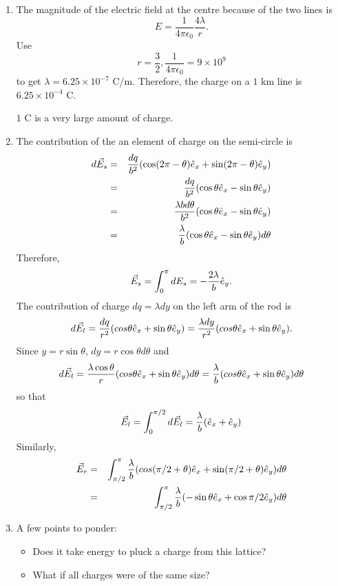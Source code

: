 \documentclass{article}
\begin{document}
\begin{enumerate}
\item The magnitude of the electric field at the centre because of the two lines
is
\[
E = \frac{1}{4\pi\epsilon_0}\frac{4\lambda}{r}.
\]
Use 
\[
r = \frac{3}{2}, \frac{1}{4\pi\epsilon_0} = 9 \times 10^9
\]
to get $\lambda = 6.25 \times 10^{-7}$ C/m. Therefore, the charge on a $1$ km
line is $6.25 \times 10^{-4}$ C.

$1$ C is a very large amount of charge.

\item The contribution of the an element of charge on the semi-circle is
\begin{eqnarray*}
d\vec{E}_s &=& \frac{dq}{b^2}(\cos(2\pi - \theta)\hat{e}_{x} + \sin(2\pi - \theta)\hat{e}_{y}) \\
 &=& \frac{dq}{b^2}(\cos\theta\hat{e}_{x} - \sin\theta\hat{e}_{y}) \\
 &=& \frac{\lambda bd\theta}{b^2}(\cos\theta\hat{e}_{x} - \sin\theta\hat{e}_{y}) \\
 &=& \frac{\lambda}{b}(\cos\theta\hat{e}_{x} - \sin\theta\hat{e}_{y})d\theta
\end{eqnarray*}
Therefore,
\[
\vec{E}_s = \int_0^\pi dE_s = -\frac{2\lambda}{b}\hat{e}_{y}.
\]
The contribution of charge $dq = \lambda dy$ on the left arm of the rod is
\[
d\vec{E}_l = \frac{dq}{r^2}(cos\theta\hat{e}_{x} + \sin\theta\hat{e}_{y}) 
= \frac{\lambda dy}{r^2}(cos\theta\hat{e}_{x} + \sin\theta\hat{e}_{y}).
\]
Since $y = r\sin\theta$, $dy = r\cos\theta d\theta$ and
\[
d\vec{E}_l = \frac{\lambda\cos\theta}{r}(cos\theta\hat{e}_{x} + \sin\theta\hat{e}_{y})d\theta
= \frac{\lambda}{b}(cos\theta\hat{e}_{x} + \sin\theta\hat{e}_{y})d\theta
\]
so that
\[
\vec{E}_l = \int_0^{\pi/2}d\vec{E}_l = \frac{\lambda}{b}(\hat{e}_{x} + \hat{e}_{y})
\]
Similarly,
\begin{eqnarray*}
\vec{E}_r &=& \int_{\pi/2}^\pi \frac{\lambda}{b}(cos(\pi/2 + \theta)\hat{e}_{x} + \sin(\pi/2 +\theta)\hat{e}_{y})d\theta \\
 &=& \int_{\pi/2}^\pi \frac{\lambda}{b}(-\sin\theta\hat{e}_{x} + \cos\pi/2\hat{e}_{y})d\theta \\
\end{eqnarray*}


\item 
A few points to ponder:
\begin{itemize}
\item Does it take energy to pluck a charge from this lattice?
\item What if all charges were of the same size?
\end{itemize}


\end{enumerate}
\end{document}
